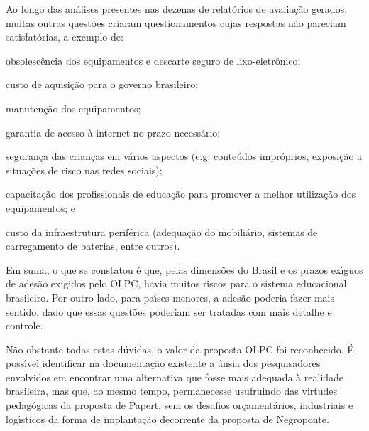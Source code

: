 \documentclass[
12pt,		%
openright,	%
twoside,  %
a4paper,			%
chapter=TITLE,		%
english,			%
french,				%
spanish,			%
brazil				%
]{USPSC-classe/USPSC}
\begin{document}
Ao longo das an\'alises presentes nas dezenas de relat\'orios de avalia\c{c}\~ao gerados, muitas outras quest\~oes criaram questionamentos cujas respostas n\~ao pareciam satisfat\'orias, a exemplo de:


















\begin{alineas}
\item obsolesc\^encia dos equipamentos e descarte seguro de lixo-eletr\^onico;
\item custo de aquisi\c{c}\~ao para o governo brasileiro;
\item manuten\c{c}\~ao dos equipamentos;
\item garantia de acesso \`a internet no prazo necess\'ario;
\item seguran\c{c}a das crian\c{c}as em v\'arios aspectos (e.g. conte\'udos impr\'oprios, exposi\c{c}\~ao a situa\c{c}\~oes de risco nas redes sociais);
\item capacita\c{c}\~ao dos profissionais de educa\c{c}\~ao para promover a melhor utiliza\c{c}\~ao dos equipamentos; e
\item custo da infraestrutura perif\'erica (adequa\c{c}\~ao do mobili\'ario, sistemas de carregamento de baterias, entre outros).
\end{alineas}

Em suma, o que se constatou \'e que, pelas dimens\~oes do Brasil e os prazos ex\'{\i}guos de ades\~ao exigidos pelo OLPC, havia muitos riscos para o sistema educacional brasileiro. Por outro lado, para pa\'{\i}ses menores, a ades\~ao poderia fazer mais sentido, dado que essas quest\~oes poderiam ser tratadas com mais detalhe e controle.

















N\~ao obstante todas estas d\'uvidas, o valor da proposta OLPC foi reconhecido. \'E poss\'{\i}vel identificar na documenta\c{c}\~ao existente a \^ansia dos pesquisadores envolvidos em encontrar uma alternativa que fosse mais adequada \`a realidade brasileira, mas que, ao mesmo tempo, permanecesse usufruindo das virtudes pedag\'ogicas da proposta de Papert, sem os desafios or\c{c}ament\'arios, industriais e log\'{\i}sticos da forma de implanta\c{c}\~ao decorrente da proposta de Negroponte.
\end{document}
